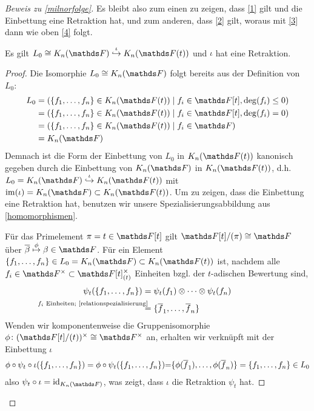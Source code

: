 \documentclass[ngerman,fontsize=11pt, paper=a4, parskip=half, titlepage=true, toc=bib]{scrartcl}
\begin{document}
\begin{proof}[Beweis zu \ref{milnorfolge}]
  Es bleibt also zum einen zu zeigen, dass \eqref{1} gilt und die Einbettung eine
  Retraktion hat, und zum anderen, dass \eqref{2} gilt, woraus mit \eqref{3} dann wie
  oben \eqref{4} folgt.
  
  \begin{Lem}
    Es gilt $L_0\cong \KnF\overset{\iota}{\hookrightarrow} \KnFt$
    und $\iota$ hat eine Retraktion.
    \begin{proof}
      Die Isomorphie $L_0\cong\KnF$ folgt bereits aus der Definition
      von $L_0$:
      \begin{align*}
        L_0
        &=\left( \{f_1,\dotsc,f_n\}\in\KnFt 
          \mid f_i\in\F[t], \deg(f_i)\leq 0\right) \\
        &=\left( \{f_1,\dotsc,f_n\}\in\KnFt 
          \mid f_i\in\F[t], \deg(f_i)= 0\right) \\
        &=\left( \{f_1,\dotsc,f_n\}\in\KnFt 
          \mid f_i\in\F\right) \\
        &=\KnF
      \end{align*}
      Demnach ist die Form der Einbettung von $L_0$ in $\KnFt$
      kanonisch gegeben durch die Einbettung von $\KnF$ in $\KnFt$, 
      d.h. $L_0=\KnF\overset{\iota}{\hookrightarrow}\KnFt$ 
      mit $\im(\iota)=\KnF\subset\KnFt$.
      Um zu zeigen, dass die Einbettung eine Retraktion hat,
      benutzen wir unsere Spezialisierungsabbildung aus 
      \ref{homomorphismen}.
      
      Für das Primelement $\pi=t\in\F[t]$ gilt $\F[t]/(\pi)\cong\F$
      über $\ov\beta\overset{\phi}{\mapsto}\beta\in\F$.
      Für ein Element $\{f_1,\dotsc, f_n\}\in L_0=\KnF\subset\KnFt$ ist,
      nachdem alle $f_i\in\Fx\subset\F[t]_{(t)}^\times$ Einheiten 
      bzgl. der $t$-adischen Bewertung sind,
      \begin{align*}
        \psi_t(\{f_1,\dotsc,f_n\})
        &={\psi_t(f_1)} \otimes\dotsb\otimes {\psi_t(f_n)}\\
        &\overset{\mathllap{\text{$f_i$ Einheiten; 
          \ref{relationspezialisierung}}}}{=}
          \{\ov f_1,\dotsc, \ov f_n\}
      \end{align*}
      Wenden wir komponentenweise die Gruppenisomorphie 
      $\phi\colon(\F[t]/(t))^\times\cong\Fx$ an, 
      erhalten wir verknüpft mit der Einbettung $\iota$
      \begin{align*}
        \phi\circ\psi_t\circ\iota(\{f_1,\dotsc,f_n\})
        =\phi\circ\psi_t(\{f_1,\dotsc,f_n\})
        {=}\{\phi(\overline f_1),\dotsc, \phi(\overline f_n)\}
        =\{f_1,\dotsc,f_n\}\in L_0
      \end{align*}
      also $\psi_t\circ \iota=\id_{\KnF}$, was zeigt, dass
      $\iota$ die Retraktion $\psi_t$ hat.
    \end{proof}
  \end{Lem}
  

\end{proof}
\end{document}
